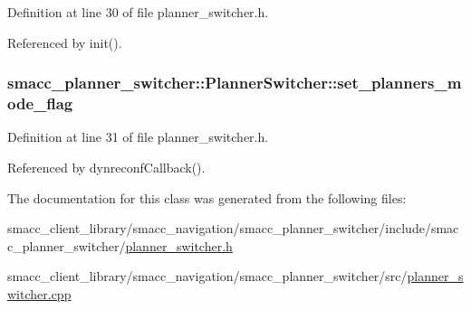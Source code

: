 Definition at line 30 of file planner\+\_\+switcher.\+h.



Referenced by init().

\subsubsection[{\texorpdfstring{set\+\_\+planners\+\_\+mode\+\_\+flag}{set_planners_mode_flag}}]{ smacc\+\_\+planner\+\_\+switcher\+::\+Planner\+Switcher\+::set\+\_\+planners\+\_\+mode\+\_\+flag\hspace{0.3cm}{\ttfamily [private]}}\hypertarget{classsmacc__planner__switcher_1_1PlannerSwitcher_a266b7a17a8c92bda2d74a7c8991a4a61}{}\label{classsmacc__planner__switcher_1_1PlannerSwitcher_a266b7a17a8c92bda2d74a7c8991a4a61}


Definition at line 31 of file planner\+\_\+switcher.\+h.



Referenced by dynreconf\+Callback().



The documentation for this class was generated from the following files\+:\begin{DoxyCompactItemize}
\item 
smacc\+\_\+client\+\_\+library/smacc\+\_\+navigation/smacc\+\_\+planner\+\_\+switcher/include/smacc\+\_\+planner\+\_\+switcher/\hyperlink{planner__switcher_8h}{planner\+\_\+switcher.\+h}\item 
smacc\+\_\+client\+\_\+library/smacc\+\_\+navigation/smacc\+\_\+planner\+\_\+switcher/src/\hyperlink{planner__switcher_8cpp}{planner\+\_\+switcher.\+cpp}\end{DoxyCompactItemize}
